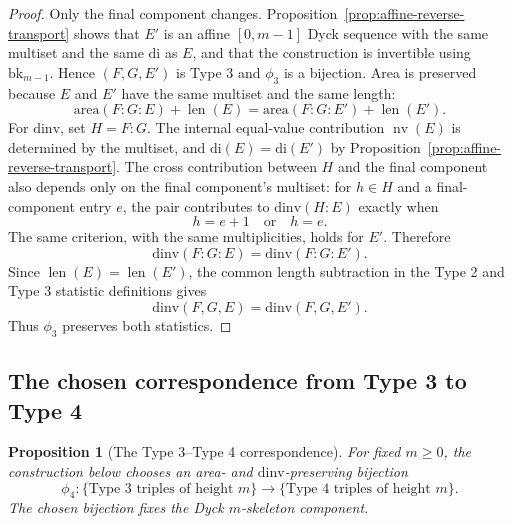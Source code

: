 \documentclass[11pt]{article}
\theoremstyle{plain}
\newtheorem{proposition}[theorem]{Proposition}
\theoremstyle{definition}
\theoremstyle{remark}
\newcommand{\di}{\mathrm{di}}
\newcommand{\dinv}{\mathrm{dinv}}
\newcommand{\area}{\mathrm{area}}
\begin{document}
\begin{proof}
Only the final component changes.  Proposition~\ref{prop:affine-reverse-transport}
shows that \(E'\) is an affine \([0,m-1]\) Dyck sequence with the same multiset
and the same \(\di\) as \(E\), and that the construction is invertible using
\(\mathrm{bk}_{m-1}\).  Hence \((F,G,E')\) is Type 3 and \(\phi_3\) is a
bijection.
Area is preserved because \(E\) and \(E'\) have the same multiset and the same
length:
\[
  \area(F:G:E)+\operatorname{len}(E)
  =\area(F:G:E')+\operatorname{len}(E').
\]
For \(\dinv\), set \(H=F:G\).  The internal equal-value contribution
\(\operatorname{nv}(E)\) is determined by the multiset, and
\(\di(E)=\di(E')\) by Proposition~\ref{prop:affine-reverse-transport}.  The
cross contribution between \(H\) and the final component also depends only on
the final component's multiset: for \(h\in H\) and a final-component entry
\(e\), the pair contributes to \(\dinv(H:E)\) exactly when
\[
  h=e+1 \quad\text{or}\quad h=e.
\]
The same criterion, with the same multiplicities, holds for \(E'\).  Therefore
\[
  \dinv(F:G:E)=\dinv(F:G:E').
\]
Since \(\operatorname{len}(E)=\operatorname{len}(E')\), the common length
subtraction in the Type 2 and Type 3 statistic definitions gives
\[
  \dinv(F,G,E)=\dinv(F,G,E').
\]
Thus \(\phi_3\) preserves both statistics.
\end{proof}


\subsection{The chosen correspondence from Type 3 to Type 4}

\begin{proposition}[The Type 3--Type 4 correspondence]
\label{prop:phi4-bijection}
For fixed \(m\ge 0\), the construction below chooses an area- and
\(\dinv\)-preserving bijection
\[
  \phi_4:
  \{\text{Type 3 triples of height }m\}
  \longrightarrow
  \{\text{Type 4 triples of height }m\}
.
\]
The chosen bijection fixes the Dyck \(m\)-skeleton component.
\end{proposition}
\end{document}
